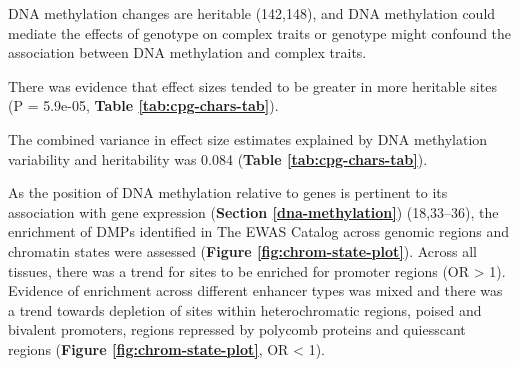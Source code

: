 \documentclass[11pt,oneside]{bristolthesis}
\begin{document}
DNA methylation changes are heritable (142,148), and DNA methylation could mediate the effects of genotype on complex traits or genotype might confound the association between DNA methylation and complex traits.

There was evidence that effect sizes tended to be greater in more heritable sites (P = 5.9e-05, \textbf{Table \ref{tab:cpg-chars-tab}}).

The combined variance in effect size estimates explained by DNA methylation variability and heritability was 0.084 (\textbf{Table \ref{tab:cpg-chars-tab}}). \linebreak
\begin{table}[!h]

\caption{\label{tab:cpg-chars-tab}Association between CpG chars and associations in EWAS}
\centering
{}
\end{table}
\linebreak

As the position of DNA methylation relative to genes is pertinent to its association with gene expression (\textbf{Section \ref{dna-methylation}}) (18,33--36), the enrichment of DMPs identified in The EWAS Catalog across genomic regions and chromatin states were assessed (\textbf{Figure \ref{fig:chrom-state-plot}}). Across all tissues, there was a trend for sites to be enriched for promoter regions (OR \textgreater{} 1). Evidence of enrichment across different enhancer types was mixed and there was a trend towards depletion of sites within heterochromatic regions, poised and bivalent promoters, regions repressed by polycomb proteins and quiesscant regions (\textbf{Figure \ref{fig:chrom-state-plot}}, OR \textless{} 1).
\end{document}
